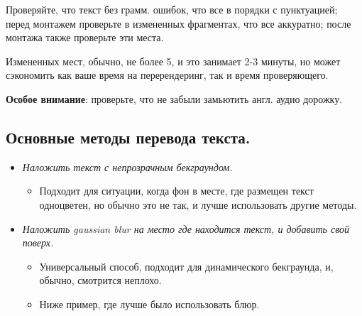 \documentclass[
a4paper, %
12pt, %
article,
onecolumn, %
openany, %
]{memoir}
\begin{document}
Проверяйте, что текст без грамм. ошибок,
что все в порядки с пунктуацией;
перед монтажем проверьте в измененных фрагментах,
что все аккуратно;
после монтажа также проверьте эти места.

Измененных мест, обычно, не более 5, и это занимает 2-3 минуты,
но может сэкономить как ваше время на перерендеринг,
так и время проверяющего.

\textbf{Особое внимание}: проверьте, что не забыли замьютить
англ. аудио дорожку.

\subsection{Основные методы перевода текста.}

\begin{itemize}
    \item \emph{Наложить текст с непрозрачным бекграундом.} 

        \begin{itemize}
            \item Подходит для ситуации, когда фон в месте, где размещен текст
        одноцветен, но обычно это не так, и лучше использовать другие методы.
        \end{itemize}

    \item \emph{Наложить gaussian blur на место где находится текст, и добавить
        свой поверх.}

        \begin{itemize}
            \item Универсальный способ, подходит для 
        динамического бекграунда, и, обычно, смотрится неплохо.

            \item Ниже пример, где лучше было использовать блюр.


\end{itemize}
\end{itemize}
\end{document}
